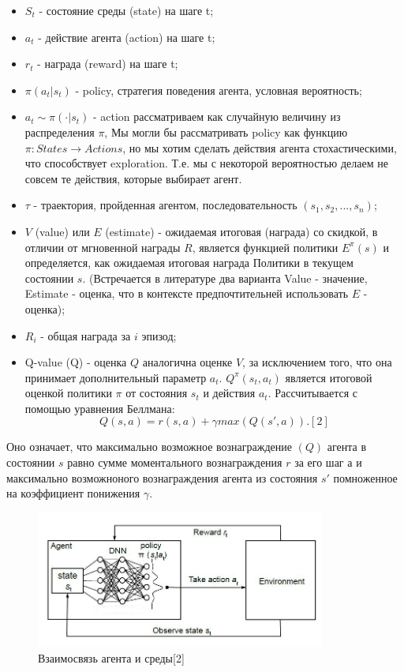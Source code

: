 \documentclass[bachelor, och, referat]{shiza}
\begin{document}
\begin{itemize}
    \item $S_t$ - состояние среды (state) на шаге t;
    \item $a_t$ - действие агента (action) на шаге t;
    \item $r_t$ - награда (reward) на шаге t;
    \item $\pi(a_t|s_t)$ - policy, стратегия поведения агента, условная вероятность;
    \item $a_t\sim\pi(\cdot|s_t)$ - action рассматриваем как случайную величину из распределения $\pi$,
    Мы могли бы рассматривать policy как функцию $\pi:States\to Actions$, но мы хотим сделать действия агента стохастическими, что способствует exploration.
    Т.е. мы с некоторой вероятностью делаем не совсем те действия, которые выбирает агент.
    \item $\tau$ - траектория, пройденная агентом, последовательность $(s_1, s_2, ..., s_n) $;
    \item $V$ (value) или $E$ (estimate) - ожидаемая итоговая (награда) со скидкой, в отличии от мгновенной награды $R$, является функцией политики $E^\pi(s)$ и
    определяется, как ожидаемая итоговая награда Политики в текущем состоянии $s$. (Встречается в литературе два варианта Value - значение, Estimate - оценка,
    что в контексте предпочтительней использовать $E$ - оценка);
    \item $R_i$ - общая награда за $i$ эпизод;
    \item Q-value (Q) - оценка $Q$ аналогична оценке $V$, за исключением того, что она принимает дополнительный параметр $a_t$. $Q^\pi(s_t, a_t)$ является итоговой
    оценкой политики $\pi$ от состояния $s_t$ и действия $a_t$. Рассчитывается с помощью уравнения Беллмана:
    \begin{equation}
        Q(s, a) = r(s, a) + \gamma max(Q(s', a)). [2]
    \end{equation}
\end{itemize}

Оно означает, что максимально возможное вознаграждение $(Q)$ агента в состоянии $s$ равно сумме моментального вознаграждения $r$ за его шаг $а$ и максимально возможноного вознаграждения агента
из состояния $s'$ помноженное на коэффициент понижения $\gamma$.

\begin{figure}[H]
    \centering
    \includegraphics[width=0.85\textwidth]{pic/1}
    \caption{Взаимосвязь агента и среды[2]}
    \label{fig:img1}
\end{figure}
\end{document}
